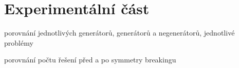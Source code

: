 
\chapter{Experimentální část}

porovnání jednotlivých generátorů, generátorů a negenerátorů, jednotlivé problémy

porovnání počtu řešení před a po symmetry breakingu











